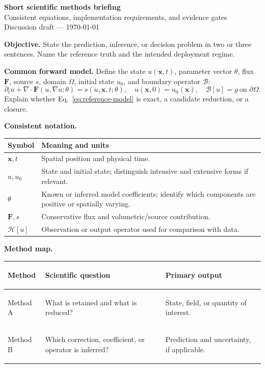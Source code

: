 \documentclass[10pt]{article}
\newcommand{\vect}[1]{\bm{#1}}
\newcommand{\NoteTitle}{Short scientific methods briefing}
\newcommand{\NoteSubtitle}{Consistent equations, implementation requirements, and evidence gates}
\newcommand{\NoteStatus}{Discussion draft --- \today}
\begin{document}
\small

\begin{center}
  {\LARGE\bfseries\color{routeblue}\NoteTitle}\\[3pt]
  {\large\NoteSubtitle}\\[4pt]
  {\normalsize\NoteStatus}
\end{center}
\vspace{-3pt}

\textbf{Objective.} State the prediction, inference, or decision problem in two or three sentences. Name the reference truth and the intended deployment regime.

\textbf{Common forward model.} Define the state $u(\vect x,t)$, parameter vector $\theta$, flux $\vect F$, source $s$, domain $\Omega$, initial state $u_0$, and boundary operator $\mathcal B$:
\begin{equation}
 \partial_t u+\nabla\cdot\vect F(u,\nabla u;\theta)=s(u,\vect x,t;\theta),
 \quad u(\vect x,0)=u_0(\vect x),
 \quad \mathcal B[u]=g\ \text{on }\partial\Omega .
 \label{eq:reference-model}
\end{equation}
Explain whether Eq.~\eqref{eq:reference-model} is exact, a candidate reduction, or a closure.

\textbf{Consistent notation.}
\begin{center}
\begin{tabularx}{0.96\textwidth}{L{0.18\textwidth}Y}
\toprule
Symbol & Meaning and units \\
\midrule
$\vect x,t$ & Spatial position and physical time. \\
$u,u_0$ & State and initial state; distinguish intensive and extensive forms if relevant. \\
$\theta$ & Known or inferred model coefficients; identify which components are positive or spatially varying. \\
$\vect F,s$ & Conservative flux and volumetric/source contribution. \\
$\mathcal H[u]$ & Observation or output operator used for comparison with data. \\
\bottomrule
\end{tabularx}
\end{center}

\textbf{Method map.}
\begin{center}
\begin{tabularx}{0.98\textwidth}{>{\bfseries\raggedright\arraybackslash}p{}Y Y}
\toprule
Method & Scientific question & Primary output \\
\midrule
Method A & What is retained and what is reduced? & State, field, or quantity of interest. \\
Method B & Which correction, coefficient, or operator is inferred? & Prediction and uncertainty, if applicable. \\
\bottomrule
\end{tabularx}
\end{center}
\end{document}
